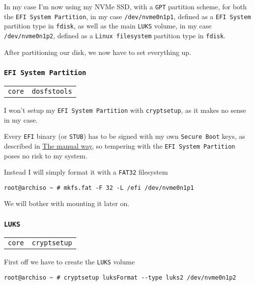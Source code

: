 \documentclass[9pt]{report}
\newenvironment{packagetable}
{\begin{longtabu}to \textwidth [b]{X[1,r]|X[1,l]}}
{\end{longtabu}}
\begin{document}
In my case I’m now using my NVMe SSD, with a \texttt{GPT} partition scheme, for both the \texttt{EFI System Partition}, in my case \texttt{/dev/nvme0n1p1}, defined as a \texttt{EFI System} partition type in \texttt{fdisk}, as well as the main \texttt{LUKS} volume, in my case \texttt{/dev/nvme0n1p2}, defined as a \texttt{Linux filesystem} partition type in \texttt{fdisk}.


After partitioning our disk, we now have to set everything up.



\newpage

\hypertarget{x-efi-system-partition}{\subsubsection{\texttt{EFI System Partition}}}
\begin{packagetable}
    \texttt{core} & \texttt{dosfstools} \\ 
\end{packagetable}

I won’t setup my \texttt{EFI System Partition} with \texttt{cryptsetup}, as it makes no sense in my case.


Every \texttt{EFI} binary (or \texttt{STUB}) has to be signed with my own \texttt{Secure Boot} keys, as described in \hyperlink{manual-secure-boot-setup}{The manual way}, so tempering with the \texttt{EFI System Partition} poses no risk to my system.


Instead I will simply format it with a \texttt{FAT32} filesystem


\begin{verbatim}
root@archiso ~ # mkfs.fat -F 32 -L /efi /dev/nvme0n1p1
\end{verbatim}

We will bother with mounting it later on.



\newpage

\hypertarget{x-luks}{\subsubsection{\texttt{LUKS}}}
\begin{packagetable}
    \texttt{core} & \texttt{cryptsetup} \\ 
\end{packagetable}

First off we have to create the \texttt{LUKS} volume


\begin{verbatim}
root@archiso ~ # cryptsetup luksFormat --type luks2 /dev/nvme0n1p2
\end{verbatim}
\end{document}
